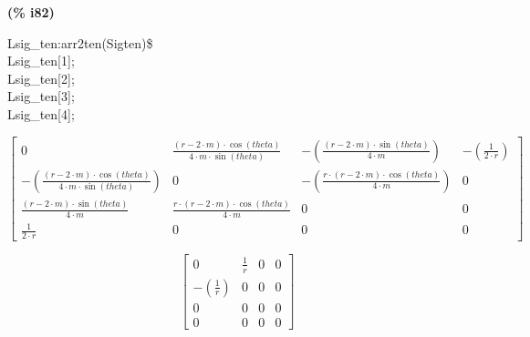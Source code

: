 \documentclass[fleqn]{article}
\begin{document}
\noindent
\begin{minipage}[t]{4.000000em}\color{red}\bfseries
(\% i82)	
\end{minipage}
\begin{minipage}[t]{\textwidth}\color{blue}
Lsig\_ten:arr2ten(Sigten)\$\\
Lsig\_ten[1];\\
Lsig\_ten[2];\\
Lsig\_ten[3];\\
Lsig\_ten[4];
\end{minipage}
\[\displaystyle \tag{\% o79} 
\begin{bmatrix}0 & \frac{\left( r\mathop{-}2\mathop{\ensuremath{\cdot}}m\right) \mathop{\ensuremath{\cdot}}\cos{(theta)}}{4\mathop{\ensuremath{\cdot}}m\mathop{\ensuremath{\cdot}}\sin{(theta)}} & \mathop{-}\left( \frac{\left( r\mathop{-}2\mathop{\ensuremath{\cdot}}m\right) \mathop{\ensuremath{\cdot}}\sin{(theta)}}{4\mathop{\ensuremath{\cdot}}m}\right)  & \mathop{-}\left( \frac{1}{2\mathop{\ensuremath{\cdot}}r}\right) \\
\mathop{-}\left( \frac{\left( r\mathop{-}2\mathop{\ensuremath{\cdot}}m\right) \mathop{\ensuremath{\cdot}}\cos{(theta)}}{4\mathop{\ensuremath{\cdot}}m\mathop{\ensuremath{\cdot}}\sin{(theta)}}\right)  & 0 & \mathop{-}\left( \frac{r\mathop{\ensuremath{\cdot}}\left( r\mathop{-}2\mathop{\ensuremath{\cdot}}m\right) \mathop{\ensuremath{\cdot}}\cos{(theta)}}{4\mathop{\ensuremath{\cdot}}m}\right)  & 0\\
\frac{\left( r\mathop{-}2\mathop{\ensuremath{\cdot}}m\right) \mathop{\ensuremath{\cdot}}\sin{(theta)}}{4\mathop{\ensuremath{\cdot}}m} & \frac{r\mathop{\ensuremath{\cdot}}\left( r\mathop{-}2\mathop{\ensuremath{\cdot}}m\right) \mathop{\ensuremath{\cdot}}\cos{(theta)}}{4\mathop{\ensuremath{\cdot}}m} & 0 & 0\\
\frac{1}{2\mathop{\ensuremath{\cdot}}r} & 0 & 0 & 0\end{bmatrix}\mbox{}\]

\[\tag{\% o80} 
\begin{bmatrix}0 & \frac{1}{r} & 0 & 0\\
\mathop{-}\left( \frac{1}{r}\right)  & 0 & 0 & 0\\
0 & 0 & 0 & 0\\
0 & 0 & 0 & 0\end{bmatrix}\mbox{}\]
\end{document}
